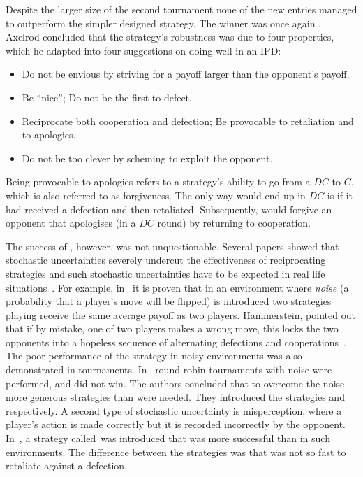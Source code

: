 Despite the larger size of the second tournament none of the new entries managed
to outperform the simpler designed strategy. The winner was once again \TitForTat.
Axelrod concluded that the strategy's
robustness was due to four properties, which he adapted into four suggestions on
doing well in an IPD:

\begin{itemize}
    \item Do not be envious by striving for a payoff larger than the opponent's payoff.
    \item Be ``nice''; Do not be the first to defect.
    \item Reciprocate both cooperation and defection; Be provocable to retaliation and to apologies.
    \item Do not be too clever by scheming to exploit the opponent.
\end{itemize}

Being provocable to apologies refers to a strategy's ability to go from a
\(DC\) to \(C\), which is also referred to as forgiveness.
The only way \TitForTat would end up in \(DC\) is if it had received a
defection and then retaliated. Subsequently, \TitForTat would forgive an
opponent that apologises (in a \(DC\) round) by returning to cooperation.

The success of \TitForTat, however, was not unquestionable. Several papers
showed that stochastic uncertainties severely undercut the effectiveness of
reciprocating strategies and such stochastic uncertainties have to be expected
in real life situations~\cite{Milinski1987}. For example, in~\cite{Molander1985}
it is
proven that in an environment where \textit{noise} (a probability that a
player's move will be flipped) is introduced two strategies playing \TitForTat
receive the same average payoff as two \Random players.
Hammerstein, pointed out that if by mistake, one of two
\TitForTat players makes a wrong move, this locks the two opponents into a
hopeless sequence of alternating defections and cooperations~\cite{Hammerstein1984}.
The poor performance of the strategy in noisy environments was also demonstrated
in tournaments. In~\cite{Bendor1991, Donninger1986} round robin
tournaments with noise were performed, and \TitForTat did not win.
The authors concluded that to overcome the noise more generous strategies
than \TitForTat were needed. They introduced the strategies \NiceandForgiving
and \OmegaTFT respectively.
A second type of stochastic uncertainty is
misperception, where a player's action is made correctly but it is recorded
incorrectly by the opponent. In~\cite{Wu1995}, a strategy
called~\ContriteTitForTat was introduced that was more successful than \TitForTat
in such environments. The difference between the strategies was that
\ContriteTitForTat was not so fast to retaliate against a defection.

